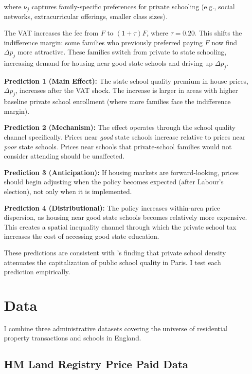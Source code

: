 \documentclass[12pt]{article}
\begin{document}
\noindent where $\nu_j$ captures family-specific preferences for private schooling (e.g., social networks, extracurricular offerings, smaller class sizes).

The VAT increases the fee from $F$ to $(1+\tau)F$, where $\tau = 0.20$. This shifts the indifference margin: some families who previously preferred paying $F$ now find $\Delta p_j$ more attractive. These families switch from private to state schooling, increasing demand for housing near good state schools and driving up $\Delta p_j$.

\textbf{Prediction 1 (Main Effect):} The state school quality premium in house prices, $\Delta p_j$, increases after the VAT shock. The increase is larger in areas with higher baseline private school enrollment (where more families face the indifference margin).

\textbf{Prediction 2 (Mechanism):} The effect operates through the school quality channel specifically. Prices near \textit{good} state schools increase relative to prices near \textit{poor} state schools. Prices near schools that private-school families would not consider attending should be unaffected.

\textbf{Prediction 3 (Anticipation):} If housing markets are forward-looking, prices should begin adjusting when the policy becomes expected (after Labour's election), not only when it is implemented.

\textbf{Prediction 4 (Distributional):} The policy increases within-area price dispersion, as housing near good state schools becomes relatively more expensive. This creates a spatial inequality channel through which the private school tax increases the cost of accessing good state education.

These predictions are consistent with \citet{fack2010}'s finding that private school density attenuates the capitalization of public school quality in Paris. I test each prediction empirically.


\section{Data}\label{sec:data}

I combine three administrative datasets covering the universe of residential property transactions and schools in England.

\subsection{HM Land Registry Price Paid Data}
\end{document}
